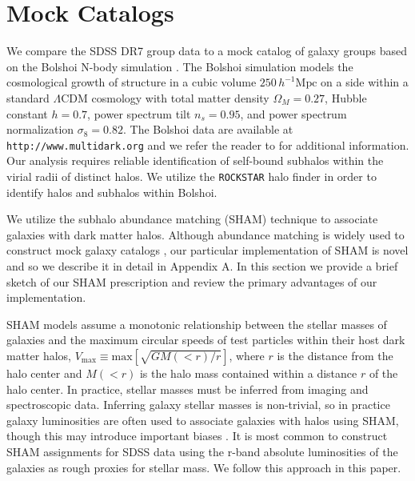 \documentclass[usenatbib,usegraphicx,letterpaper]{mn2e}
\newcommand{\vmax}{V_{\mathrm{max}}}
\newcommand{\Omegam}{\Omega_{M}}
\newcommand{\littleh}{h}
\newcommand{\tilt}{n_{s}}
\newcommand{\sigmaeight}{\sigma_{8}}
\newcommand{\lcdm}{\Lambda\mathrm{CDM}}
\begin{document}
\section{Mock Catalogs}
\label{section:mocks}


We compare the SDSS DR7 group data to a mock catalog of 
galaxy groups based on the Bolshoi N-body simulation \citep{klypin_etal11}. 
The Bolshoi simulation models the cosmological growth of structure 
in a cubic volume $250\,\littleh^{-1}\mathrm{Mpc}$ on a side within a 
standard $\lcdm$ cosmology with total matter density $\Omegam=0.27$, 
Hubble constant $\littleh=0.7$, 
power spectrum tilt $\tilt=0.95$, 
and power spectrum normalization $\sigmaeight=0.82$. 
The Bolshoi data are available at {\tt http://www.multidark.org} and we refer the 
reader to \citet{riebe_etal11} for additional information.
Our analysis requires reliable identification of self-bound 
subhalos within the virial radii of distinct halos. We utilize the 
{\tt ROCKSTAR} \citep{behroozi_etal11} halo finder in order to identify 
halos and subhalos within Bolshoi. 

We utilize the subhalo abundance matching (SHAM) technique to associate 
galaxies with dark matter halos. Although abundance matching is widely 
used to construct mock galaxy catalogs 
\cite[e.g.,][]{kravtsov_etal04,tasitsiomi_etal04,conroy_etal06,watson_etal11,hearin_etal12,reddick_etal12}, 
our particular implementation of SHAM is novel and so we describe it 
in detail in Appendix A. In this section we provide a brief sketch of our 
SHAM prescription and review the primary advantages of our implementation.


SHAM models assume a monotonic relationship between the stellar masses 
of galaxies and the maximum circular speeds of test particles 
within their host dark matter halos, $\vmax\equiv\mathrm{max}\left[\sqrt{GM(<r)/r}\right]$, 
where $r$ is the distance from the halo center and $M(<r)$ is the halo mass 
contained within a distance $r$ of the halo center. 
In practice, stellar masses must be inferred from imaging and 
spectroscopic data.  Inferring galaxy stellar masses is non-trivial, 
so in practice galaxy luminosities are often used to associate galaxies 
with halos using SHAM, though this may introduce important biases \cite[e.g.,][]{simha_etal12}.  
It is most common to construct SHAM assignments for SDSS data using 
the r-band absolute luminosities of the galaxies as rough proxies for stellar mass.  
We follow this approach in this paper.  
\end{document}

